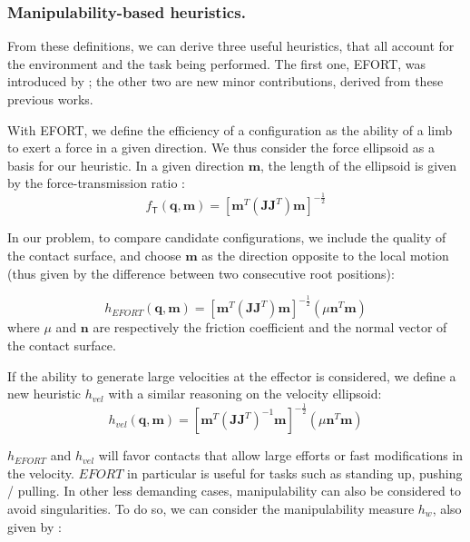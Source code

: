 \subsubsection{Manipulability-based heuristics.}
From these definitions, we can derive three useful heuristics, that all account for the environment and the task being performed.
The first one, EFORT, was introduced by \cite{Tonneau2014}; the other two are new minor contributions, derived from these previous works.

With EFORT, we define the efficiency of a configuration as the ability of a limb to exert a force in a given direction.
We thus consider the force ellipsoid as a basis for our heuristic.
In a given direction $\mathbf{m}$, the length of the ellipsoid is given by the force-transmission ratio \citep{1087795}:
\begin{equation*}
f_\mathsf{T}(\mathbf{q}, \mathbf{m}) = [\mathbf{m}^{T}(\mathbf{J}\mathbf{J}	^{T})\mathbf{m}]^{-\frac{1}{2}}
\end{equation*}

In our problem, to compare candidate configurations, we include the quality of the contact surface, and choose $\mathbf{m}$ as the direction
opposite to the local motion (thus given by the difference between two consecutive root positions):

\begin{equation}
h_{EFORT}(\mathbf{q}, \mathbf{m}) = [\mathbf{m}^{T}(\mathbf{J}\mathbf{J}^T)\mathbf{m}]^{-\frac{1}{2}} ( \mu \mathbf{n}^T \mathbf{m})
\end{equation}
where $\mu$ and $\mathbf{n}$ are respectively the friction coefficient and the normal vector of the contact surface.


If the ability to generate large velocities at the effector is considered, we define a new heuristic $h_{vel}$ with a similar reasoning on the velocity ellipsoid:
\begin{equation}
h_{vel}(\mathbf{q}, \mathbf{m}) = [\mathbf{m}^{T}(\mathbf{J}\mathbf{J}^T)^{-1}\mathbf{m}]^{-\frac{1}{2}} ( \mu \mathbf{n}^T \mathbf{m})
\end{equation}

$h_{EFORT}$ and $h_{vel}$ will favor contacts that allow large efforts or fast modifications in the velocity.
$EFORT$ in particular is useful for tasks such as standing up, pushing / pulling.
In other less demanding cases, manipulability can also be considered to avoid singularities.
To do so, we can consider the manipulability measure $h_{w}$, also given by \citeauthor{Yoshikawa1984}:

